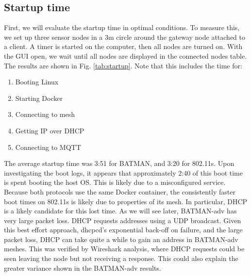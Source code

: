 \documentclass[journal]{IEEEtran}
\begin{document}
\subsection{Startup time}
First, we will evaluate the startup time in optimal conditions. To measure this, we set up three sensor nodes in a 3m circle around the gateway node attached to a client. A timer is started on the computer, then all nodes are turned on. With the GUI open, we wait until all nodes are displayed in the connected nodes table. The results are shown in Fig. \ref{tab:startup}. Note that this includes the time for:
\begin{enumerate}
    \item Booting Linux
    \item Starting Docker
    \item Connecting to mesh
    \item Getting IP over DHCP
    \item Connecting to MQTT
\end{enumerate}
The average startup time was 3:51 for BATMAN, and 3:20 for 802.11s. Upon investigating the boot logs, it appears that approximately 2:40 of this boot time is spent booting the host OS. This is likely due to a misconfigured service. Because both protocols use the same Docker container, the consistently faster boot times on 802.11s is likely due to properties of its mesh. In particular, DHCP is a likely candidate for this lost time. As we will see later, BATMAN-adv has very large packet loss. DHCP requests addresses using a UDP broadcast. Given this best effort approach, dhcpcd's exponential back-off on failure, and the large packet loss, DHCP can take quite a while to gain an address in BATMAN-adv meshes. This was verified by Wireshark analysis, where DHCP requests could be seen leaving the node but not receiving a response. This could also explain the greater variance shown in the BATMAN-adv results.
\end{document}
